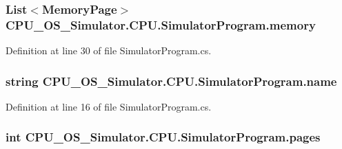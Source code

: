 \subsubsection[{memory}]{\setlength{\rightskip}{0pt plus 5cm}List$<${\bf Memory\+Page}$>$ C\+P\+U\+\_\+\+O\+S\+\_\+\+Simulator.\+C\+P\+U.\+Simulator\+Program.\+memory\hspace{0.3cm}{\ttfamily [private]}}\label{class_c_p_u___o_s___simulator_1_1_c_p_u_1_1_simulator_program_a402e53ae5daf1b6be0d5b7b705091c9c}


Definition at line 30 of file Simulator\+Program.\+cs.

\hypertarget{class_c_p_u___o_s___simulator_1_1_c_p_u_1_1_simulator_program_ad4797b5d81ceb01cd4207a97b7af36c5}{}
\subsubsection[{name}]{\setlength{\rightskip}{0pt plus 5cm}string C\+P\+U\+\_\+\+O\+S\+\_\+\+Simulator.\+C\+P\+U.\+Simulator\+Program.\+name\hspace{0.3cm}{\ttfamily [private]}}\label{class_c_p_u___o_s___simulator_1_1_c_p_u_1_1_simulator_program_ad4797b5d81ceb01cd4207a97b7af36c5}


Definition at line 16 of file Simulator\+Program.\+cs.

\hypertarget{class_c_p_u___o_s___simulator_1_1_c_p_u_1_1_simulator_program_ad86f4c2caa37cf36b8ab276ebe2a39bb}{}
\subsubsection[{pages}]{\setlength{\rightskip}{0pt plus 5cm}int C\+P\+U\+\_\+\+O\+S\+\_\+\+Simulator.\+C\+P\+U.\+Simulator\+Program.\+pages\hspace{0.3cm}{\ttfamily [private]}}\label{class_c_p_u___o_s___simulator_1_1_c_p_u_1_1_simulator_program_ad86f4c2caa37cf36b8ab276ebe2a39bb}


